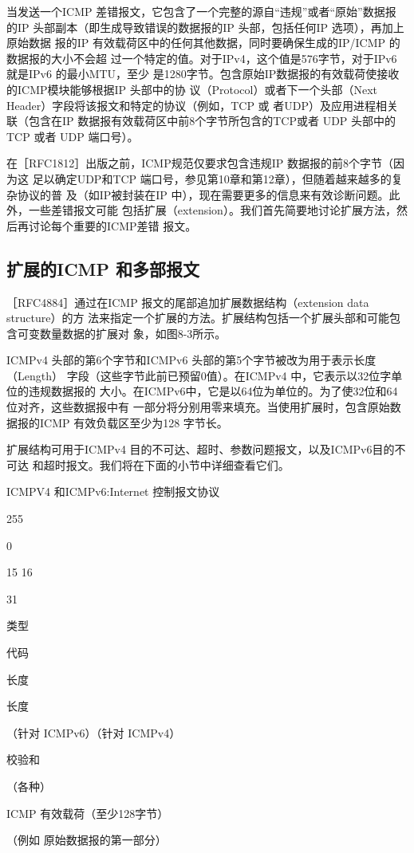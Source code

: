 当发送一个ICMP 差错报文，它包含了一个完整的源自“违规”或者“原始”数据报
的IP 头部副本（即生成导致错误的数据报的IP 头部，包括任何IP 选项），再加上原始数据
报的IP 有效载荷区中的任何其他数据，同时要确保生成的IP/ICMP 的数据报的大小不会超
过一个特定的值。对于IPv4，这个值是576字节，对于IPv6 就是IPv6 的最小MTU，至少
是1280字节。包含原始IP数据报的有效载荷使接收的ICMP模块能够根据IP 头部中的协
议（Protocol）或者下一个头部（Next Header）字段将该报文和特定的协议（例如，TCP 或
者UDP）及应用进程相关联（包含在IP 数据报有效载荷区中前8个字节所包含的TCP或者
UDP 头部中的TCP 或者 UDP 端口号）。

在［RFC1812］出版之前，ICMP规范仅要求包含违规IP 数据报的前8个字节（因为这
足以确定UDP和TCP 端口号，参见第10章和第12章），但随着越来越多的复杂协议的普
及（如IP被封装在IP 中），现在需要更多的信息来有效诊断问题。此外，一些差错报文可能
包括扩展（extension）。我们首先简要地讨论扩展方法，然后再讨论每个重要的ICMP差错
报文。

\subsection{扩展的ICMP 和多部报文}
［RFC4884］通过在ICMP 报文的尾部追加扩展数据结构（extension data structure）的方
法来指定一个扩展的方法。扩展结构包括一个扩展头部和可能包含可变数量数据的扩展对
象，如图8-3所示。

ICMPv4 头部的第6个字节和ICMPv6 头部的第5个字节被改为用于表示长度（Length）
字段（这些字节此前已预留0值）。在ICMPv4 中，它表示以32位字单位的违规数据报的
大小。在ICMPv6中，它是以64位为单位的。为了使32位和64位对齐，这些数据报中有
一部分将分别用零来填充。当使用扩展时，包含原始数据报的ICMP 有效负载区至少为128
字节长。

扩展结构可用于ICMPv4 目的不可达、超时、参数问题报文，以及ICMPv6目的不可达
和超时报文。我们将在下面的小节中详细查看它们。

ICMPV4 和ICMPv6:Internet 控制报文协议

255

0

15 16

31

类型

代码

长度

长度

（针对 ICMPv6）（针对 ICMPv4）

校验和

（各种）

ICMP 有效载荷（至少128字节）

（例如 原始数据报的第一部分）

